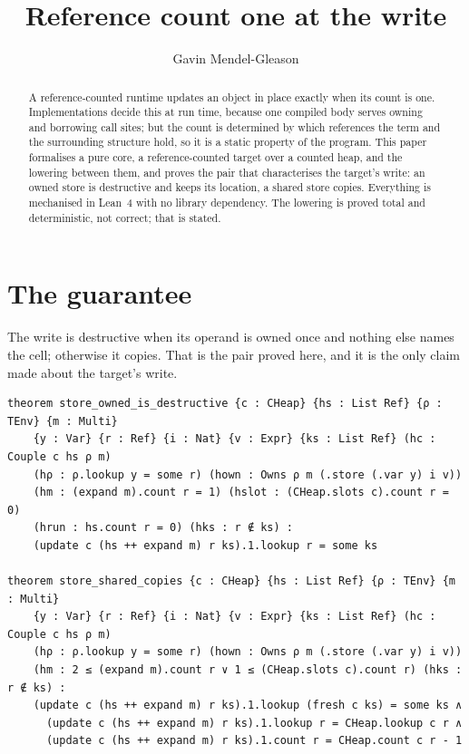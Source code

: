 \documentclass[11pt]{article}
\title{Reference count one at the write}
\author{Gavin Mendel-Gleason}
\date{}
\theoremstyle{remark}
\begin{document}
\maketitle

\begin{abstract}
A reference-counted runtime updates an object in place exactly when its count is
one. Implementations decide this at run time, because one compiled body serves
owning and borrowing call sites; but the count is determined by which references
the term and the surrounding structure hold, so it is a static property of the
program. This paper formalises a pure core, a reference-counted target over a
counted heap, and the lowering between them, and proves the pair that
characterises the target's write: an owned store is destructive and keeps its
location, a shared store copies. Everything is mechanised in Lean~4 with no
library dependency. The lowering is proved total and deterministic, not correct;
that is stated.
\end{abstract}

\section{The guarantee}

\noindent The write is destructive when its operand is owned once and nothing else
names the cell; otherwise it copies. That is the pair proved here, and it is the
only claim made about the target's write.

\begin{lstlisting}
theorem store_owned_is_destructive {c : CHeap} {hs : List Ref} {ρ : TEnv} {m : Multi}
    {y : Var} {r : Ref} {i : Nat} {v : Expr} {ks : List Ref} (hc : Couple c hs ρ m)
    (hρ : ρ.lookup y = some r) (hown : Owns ρ m (.store (.var y) i v))
    (hm : (expand m).count r = 1) (hslot : (CHeap.slots c).count r = 0)
    (hrun : hs.count r = 0) (hks : r ∉ ks) :
    (update c (hs ++ expand m) r ks).1.lookup r = some ks

theorem store_shared_copies {c : CHeap} {hs : List Ref} {ρ : TEnv} {m : Multi}
    {y : Var} {r : Ref} {i : Nat} {v : Expr} {ks : List Ref} (hc : Couple c hs ρ m)
    (hρ : ρ.lookup y = some r) (hown : Owns ρ m (.store (.var y) i v))
    (hm : 2 ≤ (expand m).count r ∨ 1 ≤ (CHeap.slots c).count r) (hks : r ∉ ks) :
    (update c (hs ++ expand m) r ks).1.lookup (fresh c ks) = some ks ∧
      (update c (hs ++ expand m) r ks).1.lookup r = CHeap.lookup c r ∧
      (update c (hs ++ expand m) r ks).1.count r = CHeap.count c r - 1
\end{lstlisting}
\end{document}
